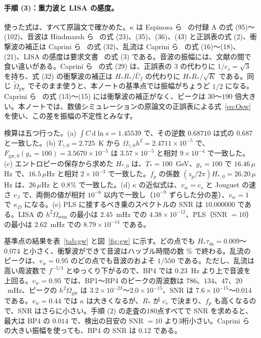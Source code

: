 \documentclass[a4paper,10pt]{ltjsarticle}
\newcommand{\dd}{\mathrm{d}}
\begin{document}
\paragraph{手順 (3)：重力波と LISA の感度。}使った式は、すべて原論文で確かめた。$\kappa$ は Espinosa ら~\cite{espinosa10} の付録 A の式 (95)〜(102)、音波は Hindmarsh ら~\cite{hhrw17} の式 (23)、(35)、(36)、(43) と正誤表の式 (2)、衝撃波の補正は Caprini ら~\cite{caprini20} の式 (32)、乱流は Caprini ら~\cite{caprini16} の式 (16)〜(18)、(21)、LISA の感度は要求文書~\cite{scird} の式 (3) である。音波の振幅には、文献の間で食い違いがある。Caprini ら~\cite{caprini20} の式 (29) は、正誤表の $3$ の代わりに $1/c_s=\sqrt3$ を持ち、式 (32) の衝撃波の補正は $H_*R_*/\bar U_f$ の代わりに $H_*R_*/\sqrt K$ である。同じ $\tilde\Omega_{\mathrm{gw}}$ でそのまま使うと、本ノートの基準点では振幅がちょうど $1/2$ になる。Caprini ら~\cite{caprini16} の式 (13)〜(15) には衝撃波の補正がなく、ピークは $30$〜$190$ 倍大きい。本ノートでは、数値シミュレーションの原論文の正誤表による式~\eqref{eq:Osw} を使い、この差を振幅の不定性とみなす。

検算は五つ行った。(a) $\int C\,\dd\ln s=1.45539$ で、その逆数 $0.68710$ は式の $0.687$ と一致した。(b) $T_{\gamma,0}=2.725$~K から $\Omega_{\gamma,0}h^2=2.4711\times10^{-5}$ で、$F_{\mathrm{gw},0}(g_*=100)=3.5670\times10^{-5}$ は $3.57\times10^{-5}$ と相対 $9\times10^{-4}$ で一致した。(c) エントロピーの保存から求めた $H_{*,0}$ は、$T_*=100$~GeV、$g_*=100$ で $16.46\,\mu$Hz で、$16.5\,\mu$Hz と相対 $2\times10^{-3}$ で一致した。$f_p$ の係数 $(z_p/2\pi)H_{*,0}=26.20\,\mu$Hz は、$26\,\mu$Hz と $0.8\%$ で一致した。(d) $\kappa$ の近似式は、$v_w=c_s$ と Jouguet の速さ $v_J$ で、両側の値が相対 $10^{-6}$ 以内で一致し（$10^{-9}$ ずらした分の差）、$v_w=1$ で $\kappa_D$ になる。(e) PLS に接するべき乗のスペクトルの SNR は $10.000000$ である。LISA の $h^2\Omega_{\mathrm{sens}}$ の最小は $2.45$~mHz での $4.38\times10^{-12}$、PLS（SNR $=10$）の最小は $2.62$~mHz での $8.79\times10^{-14}$ である。

基準点の結果を表~\ref{tab:gw} と図~\ref{fig:gw} に示す。どの点でも $H_*\tau_{\mathrm{sh}}=0.009$〜$0.074$ と小さく、衝撃波ができて音波はハッブル時間の数 \% で終わる。乱流のピークは、$v_w=0.95$ のどの点でも音波のおよそ $1/550$ である。ただし、乱流は高い周波数で $f^{-5/3}$ とゆっくり下がるので、BP4 では $0.23$~Hz より上で音波を上回る。$v_w=0.95$ では、BP1〜BP4 のピークの周波数は $786$、$134$、$47$、$20$~mHz、ピークの $h^2\Omega_{\mathrm{gw}}$ は $3.2\times10^{-23}$〜$2.0\times10^{-15}$、SNR は $7.6\times10^{-15}$〜$0.014$ である。$v_w=0.44$ では $\kappa$ は大きくなるが、$R_*$ が $c_s$ で決まり、$f_p$ も高くなるので、SNR はさらに小さい。手順 (2) の走査の180点すべてで SNR を求めると、最大は BP4 の $0.014$ で、検出の目安の SNR $=10$ より3桁小さい。Caprini ら~\cite{caprini16} の大きい振幅を使っても、BP4 の SNR は $0.12$ である。
\end{document}
